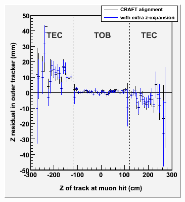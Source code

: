 \documentclass[compress]{beamer}
\begin{document}
\begin{frame}
\begin{columns}
\includegraphics[width=\linewidth]{resid_from_tracker_outer_zexpand.png}
\end{columns}
\end{frame}
\end{document}
